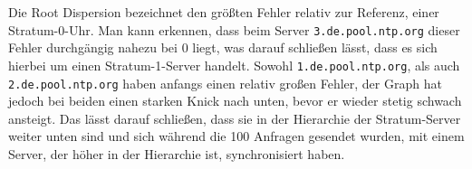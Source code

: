 \documentclass[a4paper,12pt]{scrartcl}
\begin{document}
\begin{center}
\end{center}
Die Root Dispersion bezeichnet den größten Fehler relativ zur Referenz, einer Stratum-0-Uhr. Man kann erkennen, dass beim Server \texttt{3.de.pool.ntp.org} dieser Fehler durchgängig nahezu bei 0 liegt, was darauf schließen lässt, dass es sich hierbei um einen Stratum-1-Server handelt. Sowohl  \texttt{1.de.pool.ntp.org}, als auch \texttt{2.de.pool.ntp.org} haben anfangs einen relativ großen Fehler, der Graph hat jedoch bei beiden einen starken Knick nach unten, bevor er wieder stetig schwach ansteigt. Das lässt darauf schließen, dass sie in der Hierarchie der Stratum-Server weiter unten sind und sich während die 100 Anfragen gesendet wurden, mit einem Server, der höher in der Hierarchie ist, synchronisiert haben.
\end{document}
